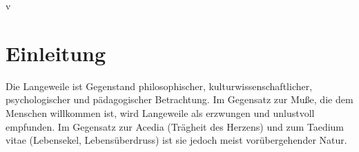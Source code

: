 v%

\chapter{Einleitung}

Die Langeweile ist Gegenstand philosophischer, kulturwissenschaftlicher, psychologischer und pädagogischer Betrachtung. Im Gegensatz zur Muße, die dem Menschen willkommen ist, wird Langeweile als erzwungen und unlustvoll empfunden. Im Gegensatz zur Acedia (Trägheit des Herzens) und zum Taedium vitae (Lebensekel, Lebensüberdruss) ist sie jedoch meist vorübergehender Natur.



